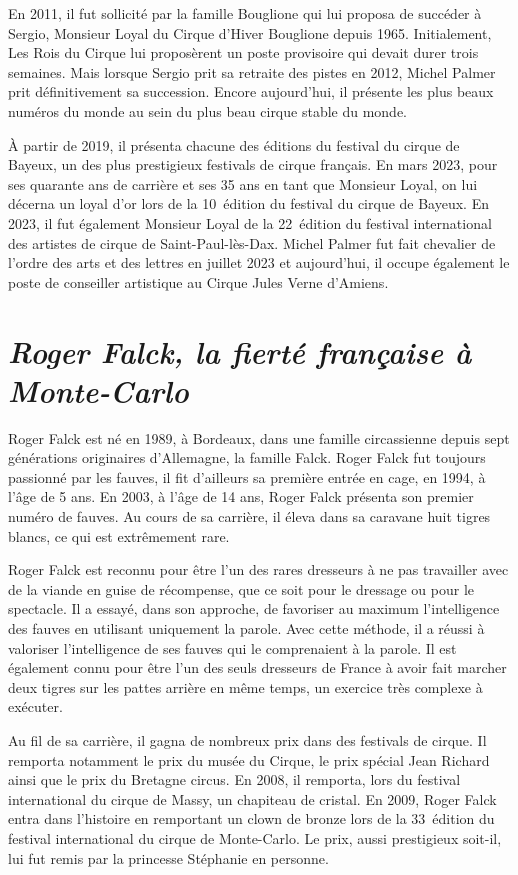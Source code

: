 En 2011, il fut sollicité par la famille Bouglione qui lui proposa de succéder à Sergio, Monsieur Loyal du Cirque d’Hiver Bouglione depuis 1965. Initialement, Les Rois du Cirque lui proposèrent un poste provisoire qui devait durer trois semaines. Mais lorsque Sergio prit sa retraite des pistes en 2012, Michel Palmer prit définitivement sa succession. Encore aujourd’hui, il présente les plus beaux numéros du monde au sein du plus beau cirque stable du monde.

À partir de 2019, il présenta chacune des éditions du festival du cirque de Bayeux, un des plus prestigieux festivals de cirque français. En mars 2023, pour ses quarante ans de carrière et ses 35 ans en tant que Monsieur Loyal, on lui décerna un loyal d’or lors de la 10\ieme~édition du festival du cirque de Bayeux. En 2023, il fut également Monsieur Loyal de la 22\ieme~édition du festival international des artistes de cirque de Saint-Paul-lès-Dax. Michel Palmer fut fait chevalier de l’ordre des arts et des lettres en juillet 2023 et aujourd’hui, il occupe également le poste de conseiller artistique au Cirque Jules Verne d’Amiens. 
\noindent
\section*{\textit{Roger Falck, la fierté française à Monte-Carlo }}
{}
\noindent
Roger Falck est né en 1989, à Bordeaux, dans une famille circassienne depuis sept générations originaires d’Allemagne, la famille Falck. Roger Falck fut toujours passionné par les fauves, il fit d’ailleurs sa première entrée en cage, en 1994, à l’âge de 5 ans. En 2003, à l'âge de 14 ans, Roger Falck présenta son premier numéro de fauves. Au cours de sa carrière, il éleva dans sa caravane huit tigres blancs, ce qui est extrêmement rare. 

Roger Falck est reconnu pour être l'un des rares dresseurs à ne pas travailler avec de la viande en guise de récompense, que ce soit pour le dressage ou pour le spectacle. Il a essayé, dans son approche, de favoriser au maximum l’intelligence des fauves en utilisant uniquement la parole. Avec cette méthode, il a réussi à valoriser l’intelligence de ses fauves qui le comprenaient à la parole. Il est également connu pour être l’un des seuls dresseurs de France à avoir fait marcher deux tigres sur les pattes arrière en même temps, un exercice très complexe à exécuter.

Au fil de sa carrière, il gagna de nombreux prix dans des festivals de cirque. Il remporta notamment le prix du musée du Cirque, le prix spécial Jean Richard ainsi que le prix du Bretagne circus. En 2008, il remporta, lors du festival international du cirque de Massy, un chapiteau de cristal.  En 2009, Roger Falck entra dans l’histoire en remportant un clown de bronze lors de la 33\ieme~édition du festival international du cirque de Monte-Carlo. Le prix, aussi prestigieux soit-il, lui fut remis par la princesse Stéphanie en personne.

